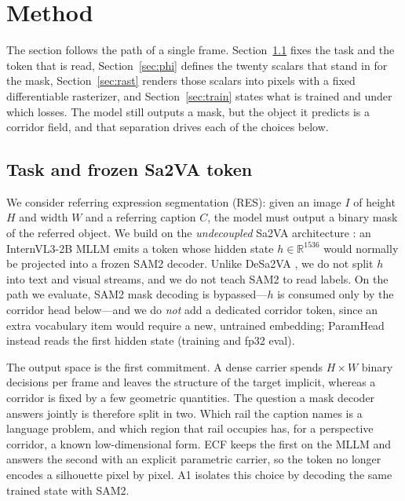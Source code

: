 \section{Method}
\label{sec:method}

The section follows the path of a single frame. Section~\ref{sec:task} fixes the task and the token that is read, Section~\ref{sec:phi} defines the twenty scalars that stand in for the mask, Section~\ref{sec:rast} renders those scalars into pixels with a fixed differentiable rasterizer, and Section~\ref{sec:train} states what is trained and under which losses. The model still outputs a mask, but the object it predicts is a corridor field, and that separation drives each of the choices below.

\subsection{Task and frozen Sa2VA token}
\label{sec:task}

We consider referring expression segmentation (RES): given an image $I$ of height $H$ and width $W$ and a referring caption $C$, the model must output a binary mask of the referred object.
We build on the \emph{undecoupled} Sa2VA architecture \citep{zhang2025sa2va}: an InternVL3-2B MLLM emits a \Seg{} token whose hidden state $h \in \mathbb{R}^{1536}$ would normally be projected into a frozen SAM2 \citep{ravi2024sam2} decoder.
Unlike DeSa2VA \citep{dang2025desa2va}, we do not split $h$ into text and visual streams, and we do not teach SAM2 to read labels.
On the path we evaluate, SAM2 mask decoding is bypassed---$h$ is consumed only by the corridor head below---and we do \emph{not} add a dedicated corridor token, since an extra vocabulary item would require a new, untrained embedding; ParamHead instead reads the first \Seg{} hidden state (training and fp32 eval).

The output space is the first commitment. A dense carrier spends $H{\times}W$ binary decisions per frame and leaves the structure of the target implicit, whereas a corridor is fixed by a few geometric quantities. The question a mask decoder answers jointly is therefore split in two. Which rail the caption names is a language problem, and which region that rail occupies has, for a perspective corridor, a known low-dimensional form. ECF keeps the first on the MLLM and answers the second with an explicit parametric carrier, so the token no longer encodes a silhouette pixel by pixel. A1 isolates this choice by decoding the same trained state with SAM2.

